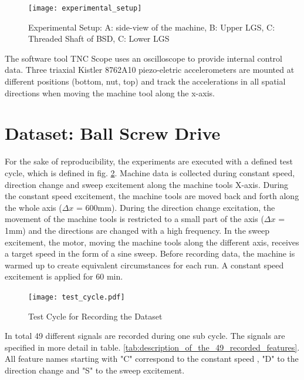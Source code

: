 \begin{figure}[H]
  \centering
  \texttt{[image: experimental\_setup]}
  \caption {Experimental Setup: A: side-view of the machine, B: Upper LGS, C: Threaded Shaft of BSD, C: Lower LGS}
  \label{fig:experimental_setup}
\end{figure}

The software tool TNC Scope uses an oscilloscope to provide internal control data. Three triaxial Kistler 8762A10 piezo-eletric accelerometers are mounted at different positions (bottom, nut, top) and track the accelerations in all spatial directions when moving the machine tool along the x-axis.

\section{Dataset: Ball Screw Drive}
For the sake of reproducibility, the experiments are executed with a defined test cycle, which is defined in fig. \ref{fig:test_cycle}. Machine data is collected during constant speed, direction change and sweep excitement along the machine tools X-axis. During the constant speed excitement, the machine tools are moved back and forth along the whole axis ($\Delta x$ = 600mm). During the direction change excitation, the movement of the machine tools is restricted to a small part of the axis ($\Delta x$ = 1mm) and the directions are changed with a high frequency. In the sweep excitement, the motor, moving the machine tools along the different axis, receives a target speed in the form of a sine sweep. Before recording data, the machine is warmed up to create equivalent circumstances for each run. A constant speed excitement is applied for 60 min. 

\begin{figure}[H]
  \centering
  \texttt{[image: test\_cycle.pdf]}
  \caption {Test Cycle for Recording the Dataset}
  \label{fig:test_cycle}
\end{figure}

In total 49 different signals are recorded during one sub cycle. The signals are specified in more detail in table. \ref{tab:description_of_the_49_recorded_features}. All feature names starting with "C" correspond to the constant speed , "D" to the direction change and "S" to the sweep excitement.

